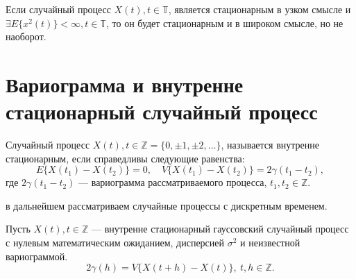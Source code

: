 \begin{Remark}
	Если случайный процесс $ X(t), t \in \mathbb{T} $, является стационарным в узком смысле и $ \exists E \{ x^2(t) \} < \infty, t \in \mathbb{T} $, то он будет стационарным и в широком смысле, но не наоборот.
\end{Remark}

\section{Вариограмма и внутренне стационарный случайный процесс}
\label{sec:variogramAndInnerStationarity}



Случайный процесс $ X(t), t \in \mathbb{Z} = \{0, \pm 1, \pm 2, \dots \} $, называется внутренне стационарным, если справедливы следующие равенства:
\begin{equation*}
	E \{ X(t_1) - X(t_2) \} = 0, \quad V \{ X(t_1) - X(t_2) \} = 2 \gamma(t_1 - t_2),
\end{equation*}
где $ 2 \gamma(t_1 - t_2) $ --- вариограмма рассматриваемого процесса, $ t_1, t_2 \in \mathbb{Z} $.


в дальнейшем рассматриваем случайные процессы с дискретным временем.

Пусть $ X(t), t \in \mathbb{Z} $ --- внутренне стационарный гауссовский случайный процесс с нулевым математическим ожиданием, дисперсией $ \sigma^2 $ и неизвестной вариограммой.
\begin{equation*}
	2 \gamma(h) = V \{ X(t + h) - X(t) \}, ~ t,h \in \mathbb{Z}.
\end{equation*}
